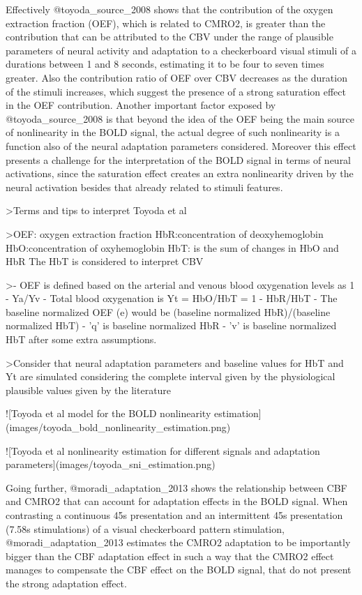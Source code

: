 Effectively @toyoda_source_2008 shows that the contribution of the oxygen extraction fraction (OEF), which is related to CMRO2, is greater than the contribution that can be attributed to the CBV under the range of plausible parameters of neural activity and adaptation to a checkerboard visual stimuli of a durations between 1 and 8 seconds, estimating it to be four to seven times greater. Also the contribution ratio of OEF over CBV decreases as the duration of the stimuli increases, which suggest the presence of a strong saturation effect in the OEF contribution. Another important factor exposed by @toyoda_source_2008 is that beyond the idea of the OEF being the main source of nonlinearity in the BOLD signal, the actual degree of such nonlinearity is a function also of the neural adaptation parameters considered. Moreover this effect presents a challenge for the interpretation of the BOLD signal in terms of neural activations, since the saturation effect creates an extra nonlinearity driven by the neural activation besides that already related to stimuli features.

>Terms and tips to interpret Toyoda et al

>OEF: oxygen extraction fraction  
HbR:concentration of deoxyhemoglobin
HbO:concentration of oxyhemoglobin  
HbT: is the sum of changes in HbO and HbR  
The HbT is considered to interpret CBV

>- OEF is defined based on the arterial and venous blood oxygenation levels as 1 - Ya/Yv  
- Total blood oxygenation is Yt = HbO/HbT = 1 - HbR/HbT  
- The baseline normalized OEF (e) would be (baseline normalized HbR)/(baseline normalized HbT)  
- 'q' is baseline normalized HbR  
- 'v' is baseline normalized HbT after some extra assumptions.

>Consider that neural adaptation parameters and baseline values for HbT and Yt are simulated considering the complete interval given by the physiological plausible values given by the literature

![Toyoda et al model for the BOLD nonlinearity estimation](images/toyoda_bold_nonlinearity_estimation.png)

![Toyoda et al nonlinearity estimation for different signals and adaptation parameters](images/toyoda_sni_estimation.png)


Going further, @moradi_adaptation_2013 shows the relationship between CBF and CMRO2 that can account for adaptation effects in the BOLD signal. When contrasting a continuous 45s presentation and an intermittent 45s presentation (7.58s stimulations) of a visual checkerboard pattern stimulation, @moradi_adaptation_2013 estimates the CMRO2 adaptation to be importantly bigger than the CBF adaptation effect in such a way that the CMRO2 effect manages to compensate the CBF effect on the BOLD signal, that do not present the strong adaptation effect.

